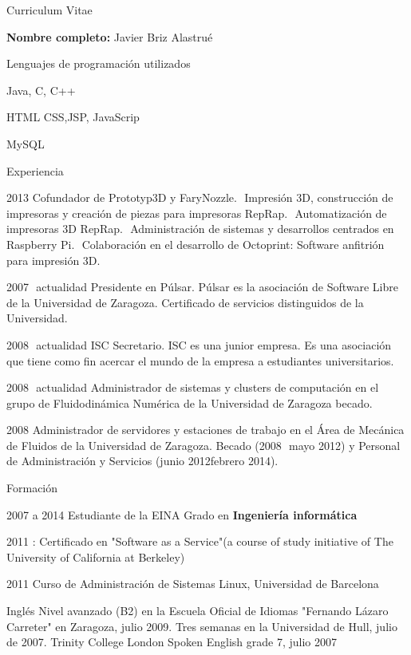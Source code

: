 \begin{cv}{Curriculum Vitae}

\vspace{0.8cm}
\textbf{Nombre completo:} Javier Briz Alastrué
\vspace{0.8cm}

\begin{cvlist}{Lenguajes de programación utilizados}
\item Java, C, C++
\item HTML CSS,JSP, JavaScrip
\item MySQL
\end{cvlist}

\begin{cvlist}{Experiencia}

	\item[2013] Co­fundador de Prototyp3D y FaryNozzle.
­ 		\subitem Impresión 3D, construcción de impresoras y creación de piezas para impresoras RepRap.
­ 		\subitem Automatización de impresoras 3D RepRap.
­ 		\subitem Administración de sistemas y desarrollos centrados en Raspberry Pi.
­ 		\subitem Colaboración en el desarrollo de Octoprint: Software anfitrión para impresión 3D.
	\item[2007  ­  actualidad]  Presidente  en  Púlsar.  Púlsar  es  la  asociación  de  Software  Libre  de  la  Universidad  de  Zaragoza.
		\subitem Certificado de servicios distinguidos de la Universidad.
	\item[2008  ­ actualidad  ISC]  Secretario.  ISC  es  una  junior empresa. Es una  asociación que tiene como  fin acercar el  mundo
	de la empresa a estudiantes universitarios.
	\item[2008  ­ actualidad]  Administrador  de  sistemas  y  clusters de computación en el grupo de Fluidodinámica Numérica de
	la Universidad de Zaragoza becado.
	\item[2008]  Administrador  de  servidores  y  estaciones  de   trabajo  en   el  Área  de  Mecánica  de  Fluidos  de  la
	Universidad  de  Zaragoza.  Becado  (2008  ­  mayo  2012)  y  Personal   de  Administración   y  Servicios  (junio  2012­febrero
	2014).
	

\end{cvlist}

\begin{cvlist}{Formación}

	\item[2007 a 2014] Estudiante de la EINA
		Grado en \textbf{Ingeniería informática}
	\item[2011]: Certificado en "Software as a Service"(a course of study initiative of The University of California at Berkeley) 
	\item [2011] Curso de Administración de Sistemas Linux, Universidad de Barcelona
	\item [Inglés] Nivel avanzado (B2) en la Escuela Oficial de Idiomas "Fernando Lázaro Carreter" en Zaragoza, julio 2009.
Tres semanas en la Universidad de Hull, julio de 2007. Trinity College London Spoken English grade 7, julio 2007


\end{cvlist}

\end{cv}